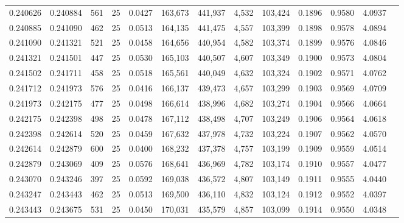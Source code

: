 \begin{tabular}{rrrrrrrrrrrrr}
0.240626 & 0.240884 &   561 &  25 &                                     0.0427 & 163,673 & 441,937 &   4,532 & 103,424 & 0.1896 & 0.9580 & 4.0937 \\
0.240885 & 0.241090 &   462 &  25 &                                     0.0513 & 164,135 & 441,475 &   4,557 & 103,399 & 0.1898 & 0.9578 & 4.0894 \\
0.241090 & 0.241321 &   521 &  25 &                                     0.0458 & 164,656 & 440,954 &   4,582 & 103,374 & 0.1899 & 0.9576 & 4.0846 \\
0.241321 & 0.241501 &   447 &  25 &                                     0.0530 & 165,103 & 440,507 &   4,607 & 103,349 & 0.1900 & 0.9573 & 4.0804 \\
0.241502 & 0.241711 &   458 &  25 &                                     0.0518 & 165,561 & 440,049 &   4,632 & 103,324 & 0.1902 & 0.9571 & 4.0762 \\
0.241712 & 0.241973 &   576 &  25 &                                     0.0416 & 166,137 & 439,473 &   4,657 & 103,299 & 0.1903 & 0.9569 & 4.0709 \\
0.241973 & 0.242175 &   477 &  25 &                                     0.0498 & 166,614 & 438,996 &   4,682 & 103,274 & 0.1904 & 0.9566 & 4.0664 \\
0.242175 & 0.242398 &   498 &  25 &                                     0.0478 & 167,112 & 438,498 &   4,707 & 103,249 & 0.1906 & 0.9564 & 4.0618 \\
0.242398 & 0.242614 &   520 &  25 &                                     0.0459 & 167,632 & 437,978 &   4,732 & 103,224 & 0.1907 & 0.9562 & 4.0570 \\
0.242614 & 0.242879 &   600 &  25 &                                     0.0400 & 168,232 & 437,378 &   4,757 & 103,199 & 0.1909 & 0.9559 & 4.0514 \\
0.242879 & 0.243069 &   409 &  25 &                                     0.0576 & 168,641 & 436,969 &   4,782 & 103,174 & 0.1910 & 0.9557 & 4.0477 \\
0.243070 & 0.243246 &   397 &  25 &                                     0.0592 & 169,038 & 436,572 &   4,807 & 103,149 & 0.1911 & 0.9555 & 4.0440 \\
0.243247 & 0.243443 &   462 &  25 &                                     0.0513 & 169,500 & 436,110 &   4,832 & 103,124 & 0.1912 & 0.9552 & 4.0397 \\
0.243443 & 0.243675 &   531 &  25 &                                     0.0450 & 170,031 & 435,579 &   4,857 & 103,099 & 0.1914 & 0.9550 & 4.0348 \\

\end{tabular}
